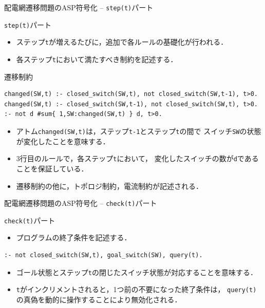 \documentclass[dvipdfmx,11pt]{beamer}
\newcommand{\code}[1]{\lstinline[basicstyle=\ttfamily]{#1}}
\begin{document}
\begin{frame}[fragile]{配電網遷移問題のASP符号化 -- \code{step(t)}パート}
\begin{block}{\code{step(t)}パート}
\begin{itemize}
 \item ステップ\code{t}が増えるたびに，追加で各ルールの基礎化が行われる．
 \item 各ステップ\code{t}において満たすべき制約を記述する．
\end{itemize}
\end{block}
\vfill
\begin{exampleblock}{遷移制約}
\begin{lstlisting}[basicstyle=\footnotesize\ttfamily]
changed(SW,t) :- closed_switch(SW,t), not closed_switch(SW,t-1), t>0.
changed(SW,t) :- closed_switch(SW,t-1), not closed_switch(SW,t), t>0.
:- not d #sum{ 1,SW:changed(SW,t) } d, t>0.
\end{lstlisting}
\end{exampleblock}
\begin{itemize}
 \item アトム\code{changed(SW,t)}は，ステップ\code{t-1}とステップ\code{t}の間で
       スイッチ\code{SW}の状態が変化したことを意味する．
 \item 3行目のルールで，各ステップ\code{t}において，
       変化したスイッチの数が\code{d}であることを保証している．
 \item 遷移制約の他に，トポロジ制約，電流制約が記述される．
\end{itemize}
\end{frame}
\begin{frame}[fragile]{配電網遷移問題のASP符号化 -- \code{check(t)}パート}
\begin{block}{\code{check(t)}パート}
\begin{itemize}
 \item プログラムの終了条件を記述する．
\end{itemize}
\end{block}
\vfill
\begin{exampleblock}{}
\begin{lstlisting}
:- not closed_switch(SW,t), goal_switch(SW), query(t).
\end{lstlisting}
\end{exampleblock}
\begin{itemize}
 \item ゴール状態とステップ\code{t}の閉じたスイッチ状態が対応することを意味する．
 \item \code{t}がインクリメントされると，1つ前の不要になった終了条件は，
       \code{query(t)}の真偽を動的に操作することにより無効化される．
\end{itemize}
\end{frame}
\end{document}
